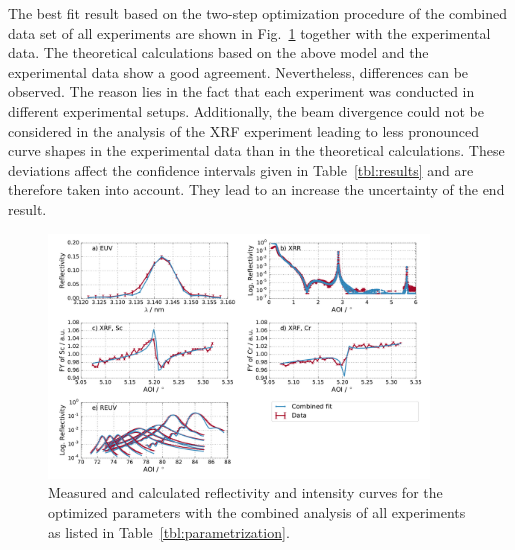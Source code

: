 The best fit result based on the two-step optimization procedure of the combined data set of all experiments are shown in Fig.~\ref{fig:combined_fit_result} together with the experimental data. The theoretical calculations based on the above model and the experimental data show a good agreement. Nevertheless, differences can be observed. The reason lies in the fact that each experiment was conducted in different experimental setups. Additionally, the beam divergence could not be considered in the analysis of the XRF experiment leading to less pronounced curve shapes in the experimental data than in the theoretical calculations. These deviations affect the confidence intervals given in Table~\ref{tbl:results} and are therefore taken into account. They lead to an increase the uncertainty of the end result.
\onecolumn
\begin{figure}
  \centering
  \includegraphics[width=0.9\textwidth]{img/im_cr_sc_multilayer/combined_fit_result}
  \caption{Measured and calculated reflectivity and intensity curves for the optimized parameters with the combined analysis of all experiments as listed in Table~\ref{tbl:parametrization}.}
  \label{fig:combined_fit_result}
\end{figure}

